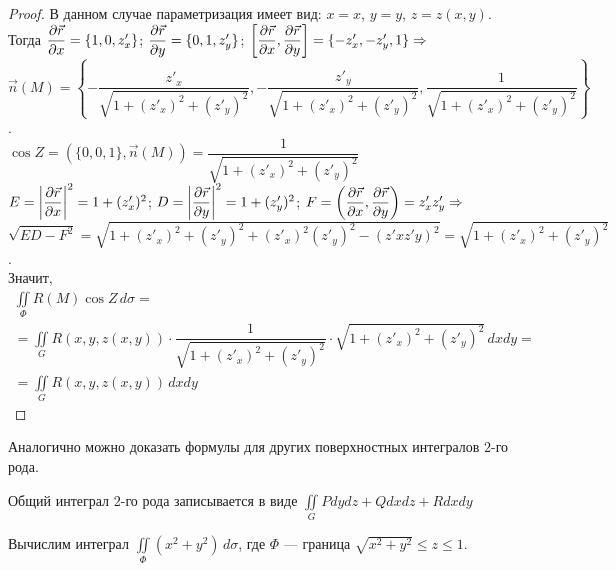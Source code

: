 \documentclass[a4paper,10pt]{article}
\begin{document}
	\begin{proof}
		В данном случае параметризация имеет вид: $x = x$, $y = y$, $z = z(x, y)$. Тогда $\dfrac{\partial \vec{r}}{\partial x} = \{1, 0, z'_x\}$; $\dfrac{\partial \vec{r}}{\partial y} = \{0, 1, z'_y\}$; $\left[ \dfrac{\partial \vec{r}}{\partial x}, \dfrac{\partial \vec{r}}{\partial y} \right] = \{-z'_x, -z'_y, 1\} \Rightarrow$ $\vec{n}(M) = \left\{ -\dfrac{z'_x}{\sqrt{1 + (z'_x)^2 + (z'_y)^2}}, -\dfrac{z'_y}{\sqrt{1 + (z'_x)^2 + (z'_y)^2}}, \dfrac{1}{\sqrt{1 + (z'_x)^2 + (z'_y)^2}} \right\}$. \\ 
		$\cos Z = (\{0, 0, 1\}, \vec{n}(M)) = \dfrac{1}{\sqrt{1 + (z'_x)^2 + (z'_y)^2}}$\\
		$E = \left| \dfrac{\partial \vec{r}}{\partial x} \right|^2 = 1 + (z'_x)^2$; $D = \left| \dfrac{\partial \vec{r}}{\partial y} \right|^2 = 1 + (z'_y)^2$; $F = \left( \dfrac{\partial \vec{r}}{\partial x}, \dfrac{\partial \vec{r}}{\partial y} \right) = z'_xz'_y \Rightarrow$ \\
		$\sqrt{ED - F^2} = \sqrt{1 + (z'_x)^2 + (z'_y)^2 + (z'_x)^2(z'_y)^2 - (z'xz'y)^2} = \sqrt{1 + (z'_x)^2 + (z'_y)^2}$. \\
		Значит,
		\begin{multline*}
		\iint\limits_\Phi R(M) \cos Z \, d\sigma 
		=\\= 
		\iint\limits_G R(x, y, z(x, y)) \cdot \dfrac{1}{{\sqrt{1 + (z'_x)^2 + (z'_y)^2}}} \cdot {\sqrt{1 + (z'_x)^2 + (z'_y)^2}} \, dxdy 
		=\\= 
		\iint\limits_G R(x, y, z(x, y)) \, dxdy
		\end{multline*}
	\end{proof}
	
	Аналогично можно доказать формулы для других поверхностных интегралов $2$-го рода.
	
	Общий интеграл $2$-го рода записывается в виде $\iint\limits_G Pdydz + Qdxdz + Rdxdy$
	
	\begin{exmp}
		Вычислим интеграл $\iint\limits_\Phi (x^2 + y^2) \, d\sigma$, где $\Phi$ --- граница $\sqrt{x^2 + y^2} \le z \le 1$.
	\end{exmp}
	
\end{document}
